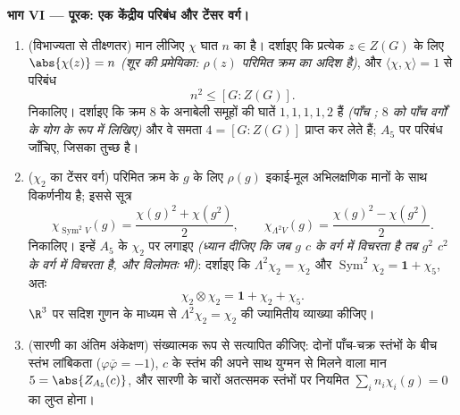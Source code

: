 \begin{problem}[{सप्ताहांत समस्या --- क्रम $p^aq^b$ के समूहों की
विलेयता}]
\medskip
\noindent\textbf{भाग VI --- पूरक: एक केंद्रीय परिबंध और टेंसर
वर्ग।}
\begin{enumerate}[resume]
  \item (विभाज्यता से तीक्ष्णतर) मान लीजिए $\chi$ घात $n$ का
         है। दर्शाइए कि प्रत्येक $z \in Z(G)$ के लिए $\abs{\chi(z)} = n$
        \emph{(शूर की प्रमेयिका: $\rho(z)$ परिमित क्रम का अदिश है)},
        और $\langle\chi, \chi\rangle = 1$ से परिबंध
        \[
        n^2 \leq [G : Z(G)] .
        \]
        निकालिए। दर्शाइए कि क्रम $8$ के अनाबेली समूहों की
         घातें $1, 1, 1, 1, 2$ हैं \emph{(पाँच ;
        $8$ को पाँच वर्गों के योग के रूप में लिखिए)} और वे समता
        $4 = [G : Z(G)]$ प्राप्त कर लेते हैं; $A_5$ पर परिबंध जाँचिए, जिसका
         तुच्छ है।
  \item ($\chi_2$ का टेंसर वर्ग) परिमित क्रम के $g$ के लिए $\rho(g)$
        इकाई-मूल अभिलक्षणिक मानों के साथ विकर्णनीय है; इससे 
        सूत्र
        \[
        \chi_{\operatorname{Sym}^2 V}(g)
        = \frac{\chi(g)^2 + \chi(g^2)}2,
        \qquad
        \chi_{\Lambda^2 V}(g)
        = \frac{\chi(g)^2 - \chi(g^2)}2 .
        \]
        निकालिए। इन्हें $A_5$ के $\chi_2$ पर लगाइए \emph{(ध्यान
        दीजिए कि जब $g$ $c$ के वर्ग में विचरता है तब $g^2$
        $c^2$ के वर्ग में विचरता है, और विलोमतः भी)}: दर्शाइए कि
        $\Lambda^2\chi_2 =
        \chi_2$ और $\operatorname{Sym}^2\chi_2 = \mathbf 1 +
        \chi_5$, अतः
        \[
        \chi_2\otimes\chi_2 = \mathbf 1 + \chi_2 + \chi_5 .
        \]
        $\R^3$ पर सदिश गुणन के माध्यम से $\Lambda^2\chi_2 = \chi_2$ की ज्यामितीय
        व्याख्या कीजिए।
  \item (सारणी का अंतिम अंकेक्षण) संख्यात्मक रूप से सत्यापित
        कीजिए: दोनों पाँच-चक्र स्तंभों के बीच स्तंभ लांबिकता
        ($\varphi\bar\varphi = -1$), $c$ के स्तंभ की अपने साथ युग्मन से मिलने वाला
        मान $5 =
        \abs{Z_{A_5}(c)}$, और सारणी के चारों अतत्समक स्तंभों पर नियमित
         $\sum_i
        n_i\chi_i(g) = 0$ का लुप्त होना।
\end{enumerate}
\end{problem}

